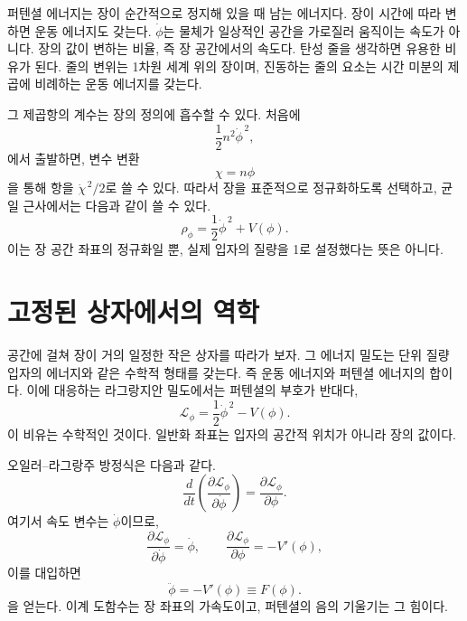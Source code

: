 퍼텐셜 에너지는 장이 순간적으로 정지해 있을 때 남는 에너지다. 장이 시간에 따라 변하면 운동 에너지도 갖는다. \(\dot\phi\)는 물체가 일상적인 공간을 가로질러 움직이는 속도가 아니다. 장의 값이 변하는 비율, 즉 장 공간에서의 속도다. 탄성 줄을 생각하면 유용한 비유가 된다. 줄의 변위는 1차원 세계 위의 장이며, 진동하는 줄의 요소는 시간 미분의 제곱에 비례하는 운동 에너지를 갖는다.

그 제곱항의 계수는 장의 정의에 흡수할 수 있다. 처음에
\begin{equation}
\frac12 n^2\dot\phi^{\,2},
\end{equation}
에서 출발하면, 변수 변환
\begin{equation}
\chi=n\phi
\end{equation}
을 통해 항을 \(\dot\chi^{\,2}/2\)로 쓸 수 있다. 따라서 장을 표준적으로 정규화하도록 선택하고, 균일 근사에서는 다음과 같이 쓸 수 있다.
\begin{equation}
\rho_\phi=\frac12\dot\phi^{\,2}+V(\phi).
\label{eq:c09-rho-homogeneous}
\end{equation}
이는 장 공간 좌표의 정규화일 뿐, 실제 입자의 질량을 1로 설정했다는 뜻은 아니다.

\section{고정된 상자에서의 역학}

공간에 걸쳐 장이 거의 일정한 작은 상자를 따라가 보자. 그 에너지 밀도는 단위 질량 입자의 에너지와 같은 수학적 형태를 갖는다. 즉 운동 에너지와 퍼텐셜 에너지의 합이다. 이에 대응하는 라그랑지안 밀도에서는 퍼텐셜의 부호가 반대다,
\begin{equation}
\mathcal L_\phi
=\frac12\dot\phi^{\,2}-V(\phi).
\label{eq:c09-lagrangian-density}
\end{equation}
이 비유는 수학적인 것이다. 일반화 좌표는 입자의 공간적 위치가 아니라 장의 값이다.

오일러--라그랑주 방정식은 다음과 같다.
\begin{equation}
\frac{d}{dt}
\left(
\frac{\partial\mathcal L_\phi}{\partial\dot\phi}
\right)
=
\frac{\partial\mathcal L_\phi}{\partial\phi}.
\label{eq:c09-el-fixed}
\end{equation}
여기서 속도 변수는 \(\dot\phi\)이므로,
\begin{equation}
\frac{\partial\mathcal L_\phi}{\partial\dot\phi}=\dot\phi,
\qquad
\frac{\partial\mathcal L_\phi}{\partial\phi}=-V'(\phi),
\end{equation}
이를 대입하면
\begin{equation}
\ddot\phi=-V'(\phi)\equiv F(\phi).
\label{eq:c09-fixed-eom}
\end{equation}
을 얻는다. 이계 도함수는 장 좌표의 가속도이고, 퍼텐셜의 음의 기울기는 그 힘이다.

